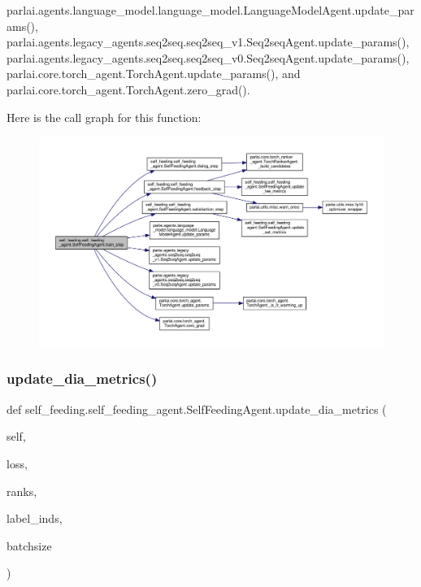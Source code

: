 parlai.\+agents.\+language\+\_\+model.\+language\+\_\+model.\+Language\+Model\+Agent.\+update\+\_\+params(), parlai.\+agents.\+legacy\+\_\+agents.\+seq2seq.\+seq2seq\+\_\+v1.\+Seq2seq\+Agent.\+update\+\_\+params(), parlai.\+agents.\+legacy\+\_\+agents.\+seq2seq.\+seq2seq\+\_\+v0.\+Seq2seq\+Agent.\+update\+\_\+params(), parlai.\+core.\+torch\+\_\+agent.\+Torch\+Agent.\+update\+\_\+params(), and parlai.\+core.\+torch\+\_\+agent.\+Torch\+Agent.\+zero\+\_\+grad().

Here is the call graph for this function\+:
\nopagebreak
\begin{figure}[H]
\begin{center}
\leavevmode
\includegraphics[width=350pt]{classself__feeding_1_1self__feeding__agent_1_1SelfFeedingAgent_a4f04842d386c1747eefba384966687de_cgraph}
\end{center}
\end{figure}
\mbox{\label{classself__feeding_1_1self__feeding__agent_1_1SelfFeedingAgent_aa2700baedf333a938accade463fefd62}} 
\subsubsection{\texorpdfstring{update\+\_\+dia\+\_\+metrics()}{update\_dia\_metrics()}}
{\footnotesize\ttfamily def self\+\_\+feeding.\+self\+\_\+feeding\+\_\+agent.\+Self\+Feeding\+Agent.\+update\+\_\+dia\+\_\+metrics (\begin{DoxyParamCaption}\item[{}]{self,  }\item[{}]{loss,  }\item[{}]{ranks,  }\item[{}]{label\+\_\+inds,  }\item[{}]{batchsize }\end{DoxyParamCaption})}




